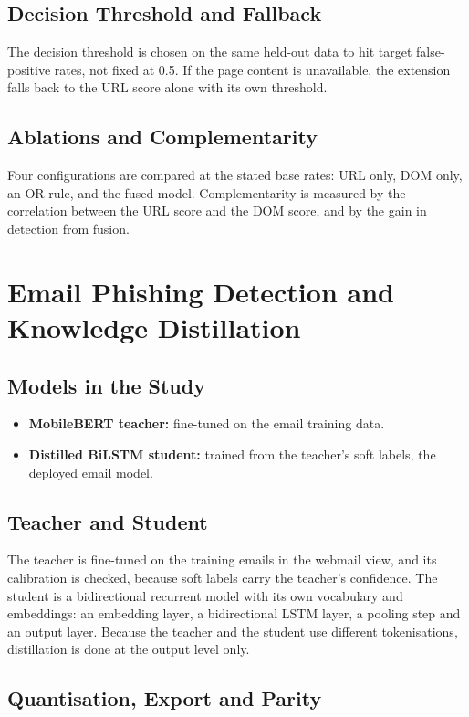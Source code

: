 \documentclass{FastFyp}
\begin{document}
\subsection{Decision Threshold and Fallback}
The decision threshold is chosen on the same held-out data to hit target false-positive rates, not fixed at 0.5. If the page content is unavailable, the extension falls back to the URL score alone with its own threshold.

\subsection{Ablations and Complementarity}
Four configurations are compared at the stated base rates: URL only, DOM only, an OR rule, and the fused model. Complementarity is measured by the correlation between the URL score and the DOM score, and by the gain in detection from fusion.

\section{Email Phishing Detection and Knowledge Distillation}
\label{sec:email}

\subsection{Models in the Study}
\begin{itemize}
    \item \textbf{MobileBERT teacher:} fine-tuned on the email training data.
    \item \textbf{Distilled BiLSTM student:} trained from the teacher's soft labels, the deployed email model.
\end{itemize}

\subsection{Teacher and Student}
The teacher is fine-tuned on the training emails in the webmail view, and its calibration is checked, because soft labels carry the teacher's confidence. The student is a bidirectional recurrent model with its own vocabulary and embeddings: an embedding layer, a bidirectional LSTM layer, a pooling step and an output layer. Because the teacher and the student use different tokenisations, distillation is done at the output level only.

\subsection{Quantisation, Export and Parity}
\end{document}

